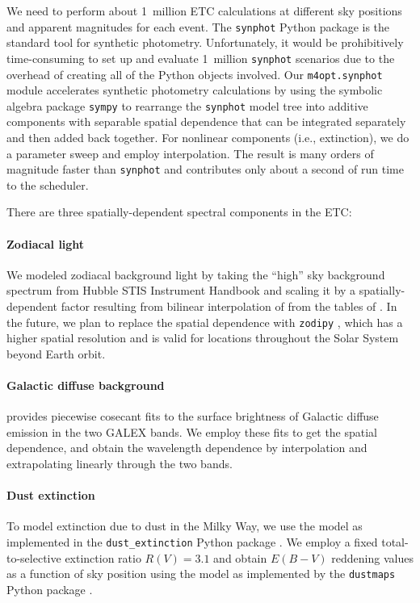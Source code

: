 \documentclass[twocolumn,times]{aastex631}
\begin{document}
We need to perform about 1~million \ac{ETC} calculations at different sky positions and apparent magnitudes for each event. The \texttt{synphot} Python package \citep{2018ascl.soft11001S} is the standard tool for synthetic photometry. Unfortunately, it would be prohibitively time-consuming to set up and evaluate 1~million \texttt{synphot} scenarios due to the overhead of creating all of the Python objects involved. Our \texttt{m4opt.synphot} module accelerates synthetic photometry calculations by using the symbolic algebra package \texttt{sympy} \citep{10.7717/peerj-cs.103} to rearrange the \texttt{synphot} model tree into additive components with separable spatial dependence that can be integrated separately and then added back together. For nonlinear components (i.e., extinction), we do a parameter sweep and employ interpolation. The result is many orders of magnitude faster than \texttt{synphot} and contributes only about a second of run time to the scheduler.

There are three spatially-dependent spectral components in the \ac{ETC}:

\paragraph{Zodiacal light}
We modeled zodiacal background light by taking the ``high'' sky background spectrum from Hubble \ac{STIS} Instrument Handbook \citep{2024stis.rept....5R} and scaling it by a spatially-dependent factor resulting from bilinear interpolation of from the tables of \citet{1998A&AS..127....1L}. In the future, we plan to replace the spatial dependence with \texttt{zodipy} \citep{2022A&A...666A.107S,2024JOSS....9.6648S}, which has a higher spatial resolution and is valid for locations throughout the Solar System beyond Earth orbit.

\paragraph{Galactic diffuse background}
\citet{2014ApJS..213...32M} provides piecewise cosecant fits to the surface brightness of Galactic diffuse emission in the two GALEX bands. We employ these fits to get the spatial dependence, and obtain the wavelength dependence by interpolation and extrapolating linearly through the two bands.

\paragraph{Dust extinction}
To model extinction due to dust in the Milky Way, we use the \citet{2023ApJ...950...86G} model as implemented in the \texttt{dust\_extinction} Python package \citep{2024JOSS....9.7023G}. We employ a fixed total-to-selective extinction ratio $R(V) = 3.1$ and obtain $E(B-V)$ reddening values as a function of sky position using the \citet{2016A&A...596A.109P} model as implemented by the \texttt{dustmaps} Python package \citep{2018JOSS....3..695M}.
\end{document}
